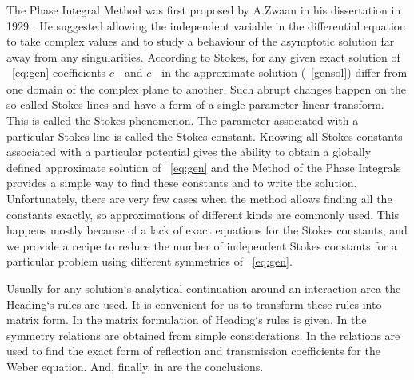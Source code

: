 \documentclass[12pt]{iopart}
\begin{document}
The Phase Integral Method was first proposed by A.Zwaan in his dissertation in 1929 \cite{zwaan}. He suggested allowing the independent variable in the differential equation to take complex values and to study a behaviour of the asymptotic solution far away from any singularities. According to Stokes\cite{stokes}, for any given exact solution of ~\ref{eq:gen} coefficients $c_+$ and $c_-$ in the approximate solution (~\ref{gensol}) differ from one domain of the complex plane to another. Such abrupt changes happen on the so-called Stokes lines and have a form of a single-parameter linear transform\cite{heading}. This is called the Stokes phenomenon. The parameter associated with a particular Stokes line is called the Stokes constant. Knowing all Stokes constants associated with a particular potential gives the ability to obtain a globally defined approximate solution of ~\ref{eq:gen}\cite{heading,white} and the Method of the Phase Integrals provides a simple way to find these constants and to write the solution. Unfortunately, there are very few cases when the method allows finding all the constants exactly, so approximations of different kinds \cite{white,ours} are commonly used. This happens mostly because of a lack of exact equations for the Stokes constants, and we provide a recipe to reduce the number of independent Stokes constants for a particular problem using different symmetries of ~\ref{eq:gen}.

Usually for any solution`s analytical continuation around an interaction area the Heading`s rules \cite{white} are used. It is convenient for us to transform these rules into matrix form. 
In  the matrix formulation of Heading`s rules is given. 
In  the symmetry relations are obtained from simple considerations. 
In  the relations are used to find the exact form of reflection and transmission coefficients for the Weber equation. 
And, finally, in  are the conclusions. 
\end{document}
